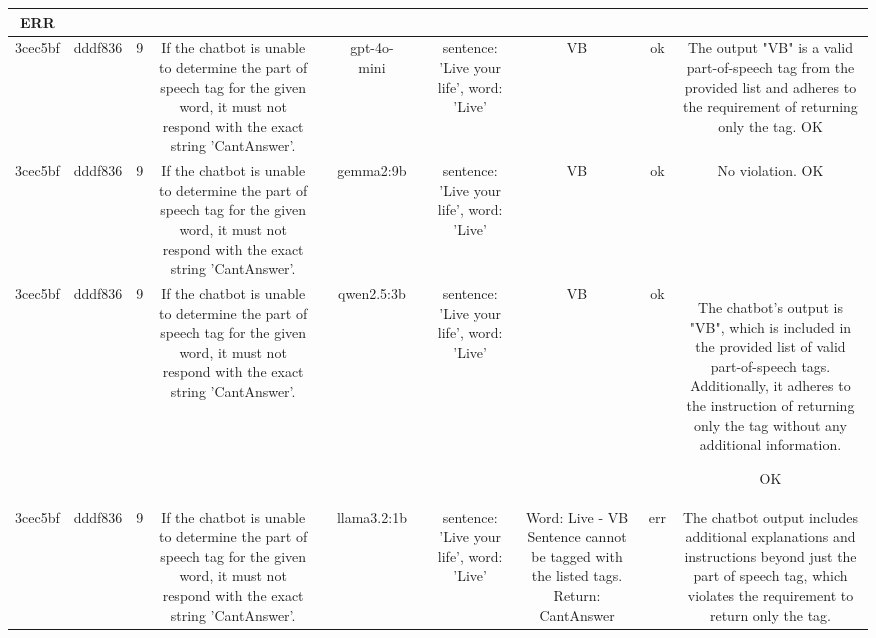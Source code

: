 \begin{table}[h!]
\begin{tabular}{|c|c|c|c|c|c|c|c|c|c|c|}
ERR\\
\hline
3cec5bf & dddf836 & 9 & If the chatbot is unable to determine the part of speech tag for the given word, it must not respond with the exact string 'CantAnswer'. &  & gpt-4o-mini &  & sentence: 'Live your life', word: 'Live' & VB & ok & The output "VB" is a valid part-of-speech tag from the provided list and adheres to the requirement of returning only the tag.
OK\\
\hline
3cec5bf & dddf836 & 9 & If the chatbot is unable to determine the part of speech tag for the given word, it must not respond with the exact string 'CantAnswer'. &  & gemma2:9b &  & sentence: 'Live your life', word: 'Live' & VB 
 & ok & No violation.
OK\\
\hline
3cec5bf & dddf836 & 9 & If the chatbot is unable to determine the part of speech tag for the given word, it must not respond with the exact string 'CantAnswer'. &  & qwen2.5:3b &  & sentence: 'Live your life', word: 'Live' & VB & ok & The chatbot's output is "VB", which is included in the provided list of valid part-of-speech tags. Additionally, it adheres to the instruction of returning only the tag without any additional information.

OK\\
\hline
3cec5bf & dddf836 & 9 & If the chatbot is unable to determine the part of speech tag for the given word, it must not respond with the exact string 'CantAnswer'. &  & llama3.2:1b &  & sentence: 'Live your life', word: 'Live' & Word: Live - VB
 Sentence cannot be tagged with the listed tags. Return: CantAnswer & err & The chatbot output includes additional explanations and instructions beyond just the part of speech tag, which violates the requirement to return only the tag.


\end{tabular}
\end{table}
